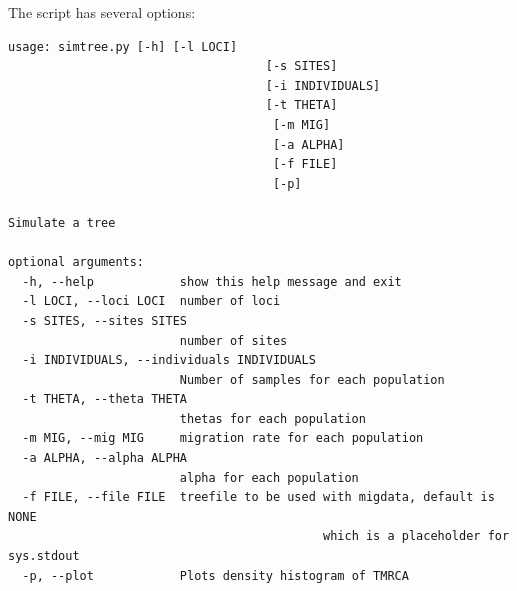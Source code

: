 \documentclass{article}
\begin{document}
\begin{samepage}

The script has several options:
\begin{verbatim}
usage: simtree.py [-h] [-l LOCI] 
                                    [-s SITES] 
                                    [-i INDIVIDUALS] 
                                    [-t THETA]
                                     [-m MIG] 
                                     [-a ALPHA] 
                                     [-f FILE] 
                                     [-p]

Simulate a tree

optional arguments:
  -h, --help            show this help message and exit
  -l LOCI, --loci LOCI  number of loci
  -s SITES, --sites SITES
                        number of sites
  -i INDIVIDUALS, --individuals INDIVIDUALS
                        Number of samples for each population
  -t THETA, --theta THETA
                        thetas for each population
  -m MIG, --mig MIG     migration rate for each population
  -a ALPHA, --alpha ALPHA
                        alpha for each population
  -f FILE, --file FILE  treefile to be used with migdata, default is NONE 
                                            which is a placeholder for sys.stdout
  -p, --plot            Plots density histogram of TMRCA
\end{verbatim}

\end{samepage}
\end{document}
